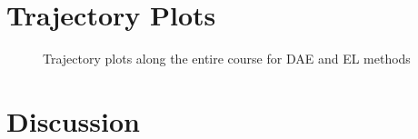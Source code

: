 \documentclass{article}
\begin{document}
\section{Trajectory Plots}
\begin{center}
	\begin{figure}[H]
		\centering
		
		\caption{Trajectory plots along the entire course for DAE and EL methods}%
		\label{fig:example5}%
	\end{figure}
\end{center}
\section{Discussion}
\end{document}
